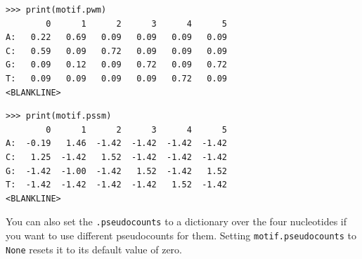 \documentclass{report}
\begin{document}
\begin{verbatim}
>>> print(motif.pwm)
        0      1      2      3      4      5
A:   0.22   0.69   0.09   0.09   0.09   0.09
C:   0.59   0.09   0.72   0.09   0.09   0.09
G:   0.09   0.12   0.09   0.72   0.09   0.72
T:   0.09   0.09   0.09   0.09   0.72   0.09
<BLANKLINE>
\end{verbatim}
\begin{verbatim}
>>> print(motif.pssm)
        0      1      2      3      4      5
A:  -0.19   1.46  -1.42  -1.42  -1.42  -1.42
C:   1.25  -1.42   1.52  -1.42  -1.42  -1.42
G:  -1.42  -1.00  -1.42   1.52  -1.42   1.52
T:  -1.42  -1.42  -1.42  -1.42   1.52  -1.42
<BLANKLINE>
\end{verbatim}
You can also set the \verb+.pseudocounts+ to a dictionary over the four nucleotides if you want to use different pseudocounts for them. Setting \verb+motif.pseudocounts+ to \verb+None+ resets it to its default value of zero.
\end{document}
